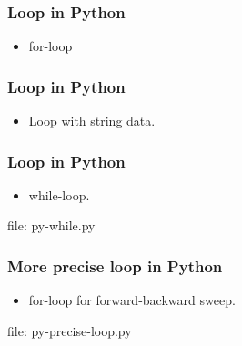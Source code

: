 \begin{frame}[fragile]
\frametitle{Loop in Python}
\begin{itemize}
\item for-loop 

\end{itemize}
\end{frame}

\begin{frame}[fragile]
\frametitle{Loop in Python}
\begin{itemize}
\item Loop with string data.

\end{itemize}
\end{frame}

\begin{frame}[fragile]
\frametitle{Loop in Python}
\newcommand{\newfilename}{py-while.py}

\begin{itemize}
\item while-loop.

\end{itemize}
file: \newfilename
\end{frame}

\begin{frame}[fragile]
\frametitle{More precise loop in Python}
\newcommand{\newfilename}{py-precise-loop.py}

\begin{itemize}
\item for-loop for forward-backward sweep.

\end{itemize}
file: \newfilename
\end{frame}